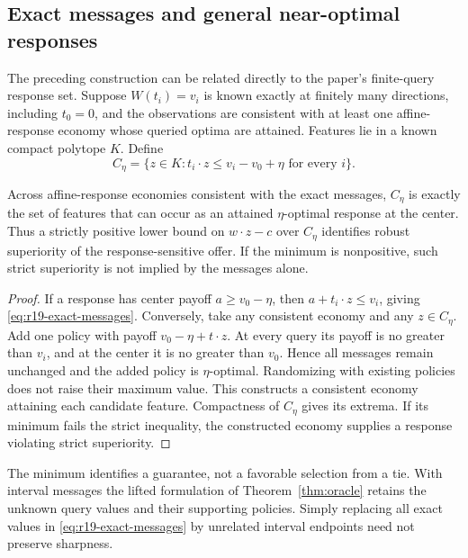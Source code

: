 \subsection{Exact messages and general near-optimal responses}
The preceding construction can be related directly to the paper's finite-query response set. Suppose $W(t_i)=v_i$ is known exactly at finitely many directions, including $t_0=0$, and the observations are consistent with at least one affine-response economy whose queried optima are attained. Features lie in a known compact polytope $K$. Define
\begin{equation}
 C_\eta=\{z\in K:t_i\cdot z\leq v_i-v_0+\eta\text{ for every }i\}.
 \label{eq:r19-exact-messages}
\end{equation}

\begin{proposition}
\label{prop:r19-sharp}
Across affine-response economies consistent with the exact messages, $C_\eta$ is exactly the set of features that can occur as an attained $\eta$-optimal response at the center. Thus a strictly positive lower bound on $w\cdot z-c$ over $C_\eta$ identifies robust superiority of the response-sensitive offer. If the minimum is nonpositive, such strict superiority is not implied by the messages alone.
\end{proposition}
\begin{proof}
If a response has center payoff $a\geq v_0-\eta$, then $a+t_i\cdot z\leq v_i$, giving \eqref{eq:r19-exact-messages}. Conversely, take any consistent economy and any $z\in C_\eta$. Add one policy with payoff $v_0-\eta+t\cdot z$. At every query its payoff is no greater than $v_i$, and at the center it is no greater than $v_0$. Hence all messages remain unchanged and the added policy is $\eta$-optimal. Randomizing with existing policies does not raise their maximum value. This constructs a consistent economy attaining each candidate feature. Compactness of $C_\eta$ gives its extrema. If its minimum fails the strict inequality, the constructed economy supplies a response violating strict superiority.
\end{proof}
The minimum identifies a guarantee, not a favorable selection from a tie. With interval messages the lifted formulation of Theorem~\ref{thm:oracle} retains the unknown query values and their supporting policies. Simply replacing all exact values in \eqref{eq:r19-exact-messages} by unrelated interval endpoints need not preserve sharpness.

